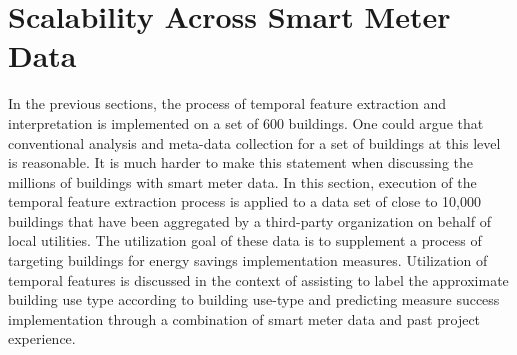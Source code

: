 \section{Scalability Across Smart Meter Data}
\label{sec:scalability}

In the previous sections, the process of temporal feature extraction and interpretation is implemented on a set of 600 buildings. One could argue that conventional analysis and meta-data collection for a set of buildings at this level is reasonable. It is much harder to make this statement when discussing the millions of buildings with smart meter data. In this section, execution of the temporal feature extraction process is applied to a data set of close to 10,000 buildings that have been aggregated by a third-party organization on behalf of local utilities. The utilization goal of these data is to supplement a process of targeting buildings for energy savings implementation measures. Utilization of temporal features is discussed in the context of assisting to label the approximate building use type according to building use-type and predicting measure success implementation through a combination of smart meter data and past project experience.


